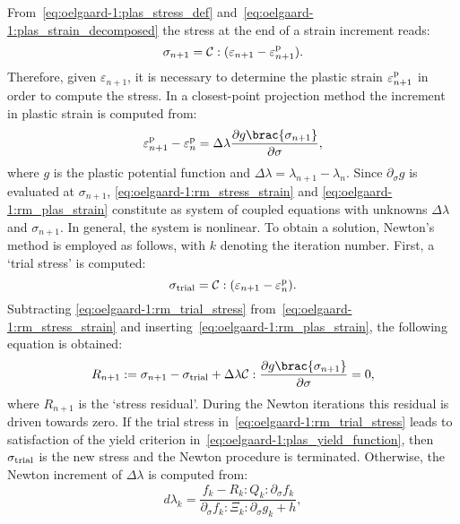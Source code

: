 From~\eqref{eq:oelgaard-1:plas_stress_def}
and~\eqref{eq:oelgaard-1:plas_strain_decomposed} the stress at the end
of a strain increment reads:
%
\begin{equation}
\label{eq:oelgaard-1:rm_stress_strain}
\sigma_{n+1} = \mathcal{C} : (\varepsilon_{n+1} - \varepsilon^{\rm p}_{n+1}).
\end{equation}
%
Therefore, given $\varepsilon_{n+1}$, it is necessary to determine the
plastic strain $\varepsilon^{\rm p}_{n+1}$ in order to compute the stress.
In a closest-point projection method the increment in plastic strain
is computed from:
%
\begin{equation}
\label{eq:oelgaard-1:rm_plas_strain}
\varepsilon^{\rm p}_{n+1} - \varepsilon^{\rm p}_{n} =
  \Delta \lambda \frac{\partial g \brac{\sigma_{n+1}}}{\partial \sigma},
\end{equation}
%
where $g$ is the plastic potential function and $\Delta \lambda
= \lambda_{n+1} - \lambda_{n}$.  Since $\partial_{\sigma} g$ is
evaluated at $\sigma_{n+1}$, \eqref{eq:oelgaard-1:rm_stress_strain}
and \eqref{eq:oelgaard-1:rm_plas_strain} constitute as system of coupled
equations with unknowns $\Delta \lambda$ and $\sigma_{n+1}$. In general,
the system is nonlinear.  To obtain a solution, Newton's method is
employed as follows, with $k$ denoting the iteration number.  First, a
`trial stress' is computed:
%
\begin{equation}
\label{eq:oelgaard-1:rm_trial_stress}
\sigma_{\rm trial} = \mathcal{C} : (\varepsilon_{n+1} - \varepsilon^{\rm p}_{n}).
\end{equation}
%
Subtracting \eqref{eq:oelgaard-1:rm_trial_stress}
from~\eqref{eq:oelgaard-1:rm_stress_strain} and
inserting~\eqref{eq:oelgaard-1:rm_plas_strain}, the following equation is
obtained:
%
\begin{equation}
\label{eq:oelgaard-1:rm_residual_stress}
R_{n+1} := \sigma_{n+1} - \sigma_{\rm trial} + \Delta \lambda \mathcal{C} :
                \frac{\partial g \brac{\sigma_{n+1}}}{\partial \sigma} = 0,
\end{equation}
%
where $R_{n+1}$ is the `stress residual'.  During the Newton
iterations this residual is driven towards zero.  If the trial stress
in~\eqref{eq:oelgaard-1:rm_trial_stress} leads to satisfaction of
the yield criterion in~\eqref{eq:oelgaard-1:plas_yield_function},
then $\sigma_{\rm trial}$ is the new stress and the Newton procedure
is terminated.  Otherwise, the Newton increment of $\Delta \lambda$
is computed from:
%
\begin{equation}
\label{eq:oelgaard-1:rm_dlambda}
d\lambda_{k} = \frac{f_{k} - R_{k} : Q_{k} : \partial_{\sigma} f_{k}}
{\partial_{\sigma} f_{k} : \Xi_{k} : \partial_{\sigma} g_{k} + h},
\end{equation}

